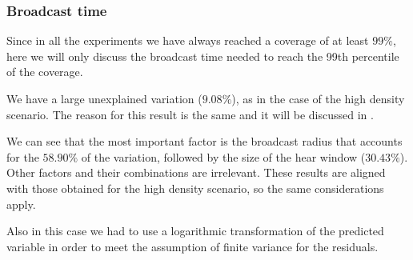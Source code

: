 \subsubsection{Broadcast time}\label{subsubsec:ld2krtime}

Since in all the experiments we have always reached a coverage of at least
\(99\%\), here we will only discuss the broadcast time needed to reach the 99th
percentile of the coverage.

We have a large unexplained variation (\(9.08\%\)), as in the case of the high
density scenario. The reason for this result is the same and it will be
discussed in .

We can see that the most important factor is the broadcast radius that accounts
for the \(58.90\%\) of the variation, followed by the size of the hear window
(\(30.43\%\)). Other factors and their combinations are irrelevant. These
results are aligned with those obtained for the high density scenario, so the
same considerations apply.

Also in this case we had to use a logarithmic transformation of the predicted
variable in order to meet the assumption of finite variance for the residuals.
